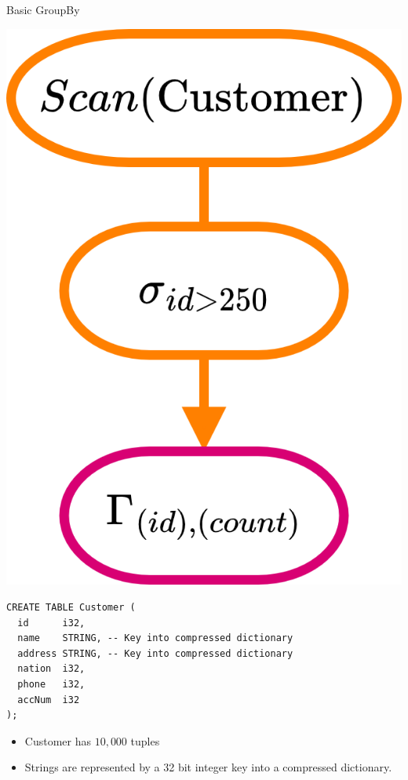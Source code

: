 \begin{examplebox}{Basic GroupBy}
  \begin{minipage}{.2\textwidth}
    \includegraphics[width=\textwidth]{processing_models/images/example_buffer_io_1.drawio.png}
  \end{minipage} \hfill \begin{minipage}{.79\textwidth}
    \begin{verbatim}
CREATE TABLE Customer (
  id      i32,
  name    STRING, -- Key into compressed dictionary
  address STRING, -- Key into compressed dictionary
  nation  i32,
  phone   i32,
  accNum  i32
);
    \end{verbatim}
    \begin{itemize}
      \item Customer has $10,000$ tuples
      \item Strings are represented by a 32 bit integer key into a compressed dictionary. 

\end{itemize}
\end{minipage}
\end{examplebox}
